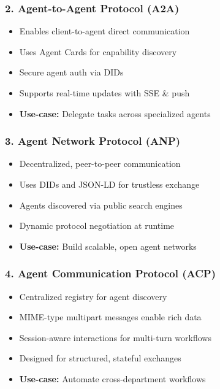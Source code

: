 \begin{frame}[fragile]\frametitle{2. Agent-to-Agent Protocol (A2A)}
      \begin{itemize}
        \item Enables client-to-agent direct communication
        \item Uses Agent Cards for capability discovery
        \item Secure agent auth via DIDs
        \item Supports real-time updates with SSE \& push
        \item \textbf{Use-case:} Delegate tasks across specialized agents
      \end{itemize}
\end{frame}

\begin{frame}[fragile]\frametitle{3. Agent Network Protocol (ANP)}
      \begin{itemize}
        \item Decentralized, peer-to-peer communication
        \item Uses DIDs and JSON-LD for trustless exchange
        \item Agents discovered via public search engines
        \item Dynamic protocol negotiation at runtime
        \item \textbf{Use-case:} Build scalable, open agent networks
      \end{itemize}
\end{frame}

\begin{frame}[fragile]\frametitle{4. Agent Communication Protocol (ACP)}
      \begin{itemize}
        \item Centralized registry for agent discovery
        \item MIME-type multipart messages enable rich data
        \item Session-aware interactions for multi-turn workflows
        \item Designed for structured, stateful exchanges
        \item \textbf{Use-case:} Automate cross-department workflows
      \end{itemize}
\end{frame}


